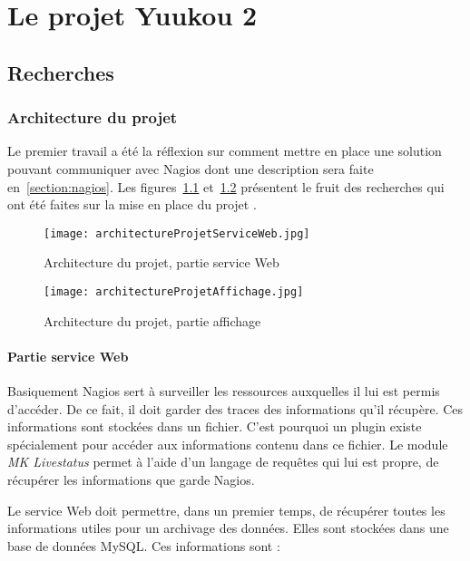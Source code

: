 \chapter{Le projet Yuukou 2}

\section{Recherches}

\subsection{Architecture du projet}

Le premier travail a \'et\'e la r\'eflexion sur comment mettre en place une solution pouvant communiquer avec Nagios dont une description sera faite en~\ref{section:nagios}.
Les figures~\ref{figure:architectureProjetServiceWeb} et~\ref{figure:architectureProjetAffichage} pr\'esentent le fruit des recherches qui ont \'et\'e faites sur la mise en place du projet \YuukouII.

\begin{figure}[!ht]
	\centering
	\texttt{[image: architectureProjetServiceWeb.jpg]}
	\caption{Architecture du projet, partie service Web}
	\label{figure:architectureProjetServiceWeb}

\end{figure}

\begin{figure}[!ht]
	\centering
	\texttt{[image: architectureProjetAffichage.jpg]}
	\caption{Architecture du projet, partie affichage}
	\label{figure:architectureProjetAffichage}

\end{figure}

\subsubsection{Partie service Web}

Basiquement Nagios sert \`a surveiller les ressources auxquelles il lui est permis d'acc\'eder.
De ce fait, il doit garder des traces des informations qu'il r\'ecup\`ere.
Ces informations sont stock\'ees dans un fichier.
C'est pourquoi un plugin existe sp\'ecialement pour acc\'eder aux informations contenu dans ce fichier. 
Le module \textit{MK Livestatus} permet \`a l'aide d'un langage de requ\^etes qui lui est propre, de r\'ecup\'erer les informations que garde Nagios.

Le service Web doit permettre, dans un premier temps, de r\'ecup\'erer toutes les informations utiles pour un archivage des donn\'ees.
Elles sont stock\'ees dans une base de donn\'ees MySQL.
\noindent Ces informations sont :

